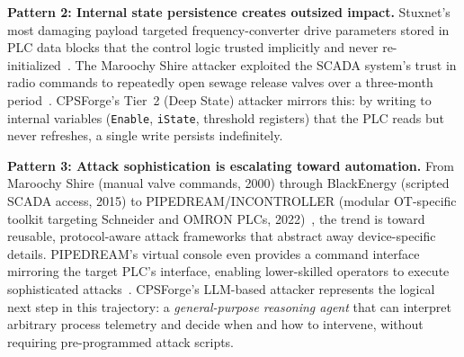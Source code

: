 \textbf{Pattern 2: Internal state persistence creates outsized impact.} Stuxnet's most damaging payload targeted frequency-converter drive parameters stored in PLC data blocks that the control logic trusted implicitly and never re-initialized~\cite{falliere2011w32}. The Maroochy Shire attacker exploited the SCADA system's trust in radio commands to repeatedly open sewage release valves over a three-month period~\cite{abrams2008maroochy}. CPSForge's Tier~2 (Deep State) attacker mirrors this: by writing to internal variables (\texttt{Enable}, \texttt{iState}, threshold registers) that the PLC reads but never refreshes, a single write persists indefinitely.

\textbf{Pattern 3: Attack sophistication is escalating toward automation.} From Maroochy Shire (manual valve commands, 2000) through BlackEnergy (scripted SCADA access, 2015) to PIPEDREAM/INCONTROLLER (modular OT-specific toolkit targeting Schneider and OMRON PLCs, 2022)~\cite{cisa2022pipedream}, the trend is toward reusable, protocol-aware attack frameworks that abstract away device-specific details. PIPEDREAM's virtual console even provides a command interface mirroring the target PLC's interface, enabling lower-skilled operators to execute sophisticated attacks~\cite{greenberg2022pipedream}. CPSForge's LLM-based attacker represents the logical next step in this trajectory: a \emph{general-purpose reasoning agent} that can interpret arbitrary process telemetry and decide when and how to intervene, without requiring pre-programmed attack scripts.

